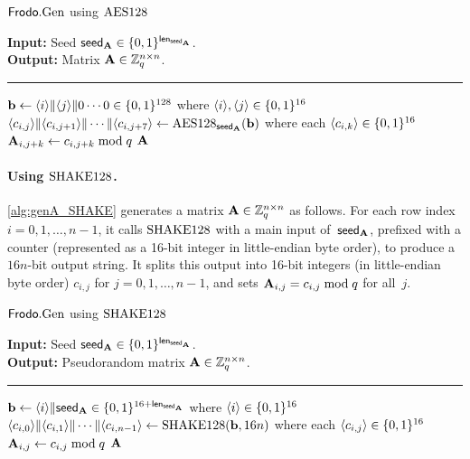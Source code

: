 \documentclass{iacrcc}
\begin{document}
\begin{algorithm}[H]
\caption{\label{alg:genA_AES} $\textsf{\upshape\mdseries Frodo}.\textrm{\upshape\mdseries Gen}$ using $\textrm{\upshape\mdseries AES128}$}
{\bf Input:} Seed ${\mathsf{seed}_{\mathbf{A}}} \in \{0,1\}^{\mathsf{len}_{{\mathsf{seed}_{\mathbf{A}}}}}$.\\
{\bf Output:} Matrix $\mathbf{A} \in \mathbb{Z}_q^{n\times n}$.\\[-1.5ex]
\rule{\linewidth}{.5pt}
\vspace{-0.5cm}
\begin{algorithmic}[1]
    \STATE $\mathbf{b} \gets \langle i\rangle \| \langle j\rangle \|0 \cdots 0 \in
    \{0,1\}^{128}$ where $\langle i\rangle, \langle j\rangle \in \{0,1\}^{16}$
    \STATE $\langle c_{i,j}\rangle \| \langle c_{i,j+1}\rangle \| \cdots \| \langle c_{i,j+7}\rangle \gets
    \textrm{\upshape\mdseries AES128}_{{\mathsf{seed}_{\mathbf{A}}}}(\mathbf{b})$ where each $\langle c_{i,k}\rangle \in \{0,1\}^{16}$
    \STATE $\mathbf{A}_{i,j+k} \gets c_{i,j+k} \bmod q$
    \ENDFOR
    \ENDFOR
    \ENDFOR
    \RETURN $\mathbf{A}$
\end{algorithmic}
\end{algorithm}

\paragraph{Using $\textrm{\upshape\mdseries SHAKE}128$.}

\autoref{alg:genA_SHAKE} generates a matrix
$\mathbf{A} \in \mathbb{Z}_{q}^{n \times n}$ as follows. For each row index
$i=0,1,\ldots,n-1$, it calls $\textrm{\upshape\mdseries SHAKE}128$ with a main input
of~${\mathsf{seed}_{\mathbf{A}}}$, prefixed with a counter (represented as a 16-bit integer in little-endian byte order), to produce a
$16n$-bit output string. It splits this output into 16-bit integers (in little-endian byte order)
$c_{i,j}$ for $j=0,1,\ldots, n-1$, and sets
$\mathbf{A}_{i,j} = c_{i,j} \bmod q$ for all~$j$.

\begin{algorithm}[H]
\caption{\label{alg:genA_SHAKE} $\textsf{\upshape\mdseries Frodo}.\textrm{\upshape\mdseries Gen}$ using $\textrm{\upshape\mdseries SHAKE}128$}
{\bf Input:} Seed ${\mathsf{seed}_{\mathbf{A}}} \in \{0,1\}^{\mathsf{len}_{{\mathsf{seed}_{\mathbf{A}}}}}$.\\
{\bf Output:} Pseudorandom matrix $\mathbf{A} \in \mathbb{Z}_q^{n\times n}$.\\[-1.5ex]
\rule{\linewidth}{.5pt}
\vspace{-0.5cm}
\begin{algorithmic}[1]
    \STATE $\mathbf{b} \gets \langle i\rangle \| {\mathsf{seed}_{\mathbf{A}}} \in
    \{0,1\}^{16+{\mathsf{len}_{{\mathsf{seed}_{\mathbf{A}}}}}}$ where $\langle i\rangle \in \{0,1\}^{16}$
    \STATE $\langle c_{i,0}\rangle \| \langle c_{i,1}\rangle \| \cdots \|
    \langle c_{i,n-1}\rangle \gets \textrm{\upshape\mdseries SHAKE}128(\mathbf{b}, 16n)$
    where each $\langle c_{i,j}\rangle \in \{0,1\}^{16}$
    \STATE $\mathbf{A}_{i,j} \gets c_{i,j} \bmod q$
    \ENDFOR
    \ENDFOR
    \RETURN$\mathbf{A}$
\end{algorithmic}
\end{algorithm}
\end{document}
